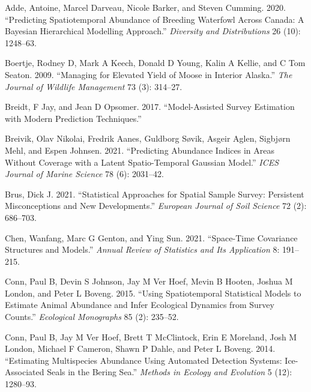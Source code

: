 \documentclass[smallextended]{svjour3}       %
\newlength{\cslhangindent}
\newlength{\cslentryspacingunit} %
\newenvironment{CSLReferences}[2] %
 {%
  \setlength{\parindent}{0pt}
  \ifodd #1
  \let\oldpar\par
  \def\par{\hangindent=\cslhangindent\oldpar}
  \fi
  \setlength{\parskip}{#2\cslentryspacingunit}
 }%
 {}
\begin{document}
\hypertarget{refs}{}
\begin{CSLReferences}{1}{0}
\leavevmode{}%
Adde, Antoine, Marcel Darveau, Nicole Barker, and Steven Cumming. 2020.
{``Predicting Spatiotemporal Abundance of Breeding Waterfowl Across
Canada: A Bayesian Hierarchical Modelling Approach.''} \emph{Diversity
and Distributions} 26 (10): 1248--63.

\leavevmode{}%
Boertje, Rodney D, Mark A Keech, Donald D Young, Kalin A Kellie, and C
Tom Seaton. 2009. {``Managing for Elevated Yield of Moose in Interior
Alaska.''} \emph{The Journal of Wildlife Management} 73 (3): 314--27.

\leavevmode{}%
Breidt, F Jay, and Jean D Opsomer. 2017. {``Model-Assisted Survey
Estimation with Modern Prediction Techniques.''}

\leavevmode{}%
Breivik, Olav Nikolai, Fredrik Aanes, Guldborg Søvik, Asgeir Aglen,
Sigbjørn Mehl, and Espen Johnsen. 2021. {``Predicting Abundance Indices
in Areas Without Coverage with a Latent Spatio-Temporal Gaussian
Model.''} \emph{ICES Journal of Marine Science} 78 (6): 2031--42.

\leavevmode{}%
Brus, Dick J. 2021. {``Statistical Approaches for Spatial Sample Survey:
Persistent Misconceptions and New Developments.''} \emph{European
Journal of Soil Science} 72 (2): 686--703.

\leavevmode{}%
Chen, Wanfang, Marc G Genton, and Ying Sun. 2021. {``Space-Time
Covariance Structures and Models.''} \emph{Annual Review of Statistics
and Its Application} 8: 191--215.

\leavevmode{}%
Conn, Paul B, Devin S Johnson, Jay M Ver Hoef, Mevin B Hooten, Joshua M
London, and Peter L Boveng. 2015. {``Using Spatiotemporal Statistical
Models to Estimate Animal Abundance and Infer Ecological Dynamics from
Survey Counts.''} \emph{Ecological Monographs} 85 (2): 235--52.

\leavevmode{}%
Conn, Paul B, Jay M Ver Hoef, Brett T McClintock, Erin E Moreland, Josh
M London, Michael F Cameron, Shawn P Dahle, and Peter L Boveng. 2014.
{``Estimating Multispecies Abundance Using Automated Detection Systems:
Ice-Associated Seals in the Bering Sea.''} \emph{Methods in Ecology and
Evolution} 5 (12): 1280--93.


\end{CSLReferences}
\end{document}
